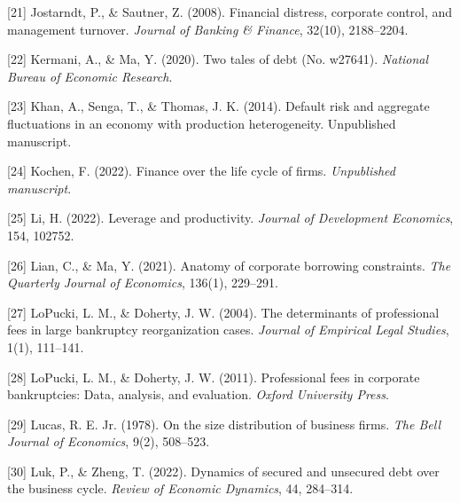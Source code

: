 \documentclass[12pt]{article}
\begin{document}
\noindent
\hangindent=0.7cm
[21] Jostarndt, P., \& Sautner, Z. (2008). Financial distress, corporate control, and management turnover. \textit{Journal of Banking \& Finance}, 32(10), 2188--2204.
\vspace{3mm}

\noindent
\hangindent=0.7cm
[22] Kermani, A., \& Ma, Y. (2020). Two tales of debt (No. w27641). \textit{National Bureau of Economic Research}.
\vspace{3mm}

\noindent
\hangindent=0.7cm
[23] Khan, A., Senga, T., \& Thomas, J. K. (2014). Default risk and aggregate fluctuations in an economy with production heterogeneity. Unpublished manuscript.
\vspace{-1mm}

\noindent
\hangindent=0.7cm
[24] Kochen, F. (2022). Finance over the life cycle of firms. \textit{Unpublished manuscript}.
\vspace{-1mm}

\noindent
\hangindent=0.7cm
[25] Li, H. (2022). Leverage and productivity. \textit{Journal of Development Economics}, 154, 102752.
\vspace{3mm}

\noindent
\hangindent=0.7cm
[26] Lian, C., \& Ma, Y. (2021). Anatomy of corporate borrowing constraints. \textit{The Quarterly Journal of Economics}, 136(1), 229--291.
\vspace{3mm}

\noindent
\hangindent=0.7cm
[27] LoPucki, L. M., \& Doherty, J. W. (2004). The determinants of professional fees in large bankruptcy reorganization cases. \textit{Journal of Empirical Legal Studies}, 1(1), 111--141.
\vspace{3mm}

\noindent
\hangindent=0.7cm
[28] LoPucki, L. M., \& Doherty, J. W. (2011). Professional fees in corporate bankruptcies: Data, analysis, and evaluation. \textit{Oxford University Press}.
\vspace{3mm}

\noindent
\hangindent=0.7cm
[29] Lucas, R. E. Jr. (1978). On the size distribution of business firms. \textit{The Bell Journal of Economics}, 9(2), 508--523.
\vspace{3mm}

\noindent
\hangindent=0.7cm
[30] Luk, P., \& Zheng, T. (2022). Dynamics of secured and unsecured debt over the business cycle. \textit{Review of Economic Dynamics}, 44, 284--314.
\vspace{3mm}
\end{document}
